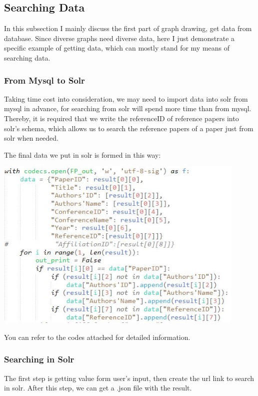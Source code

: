 \documentclass[10pt,twoside,a4paper,titlepage]{article}
\begin{document}
	\subsection{Searching Data}
		\par In this subsection I mainly discuss the first part of graph drawing, get data from database. Since diverse graphs need diverse data, here I just demonstrate a specific example of getting data, which can mostly stand for my means of searching data.
		\subsubsection{From Mysql to Solr}
			\par Taking time cost into consideration, we may need to import data into solr from mysql in advance, for searching from solr will spend more time than from mysql. Thereby, it is required that we write the referenceID of reference papers into solr's schema, which allows us to search the reference papers of a paper just from solr when needed.
			\par The final data we put in solr is formed in this way:\newline\par
			\includegraphics[width=0.9\textwidth]{gjl/formdata.jpg}\newline\par
		You can refer to the codes attached for detailed information.
		\subsubsection{Searching in Solr}
			\par The first step is getting value form user's input, then create the url link to search in solr. After this step, we can get a .json file with the result.
\end{document}
